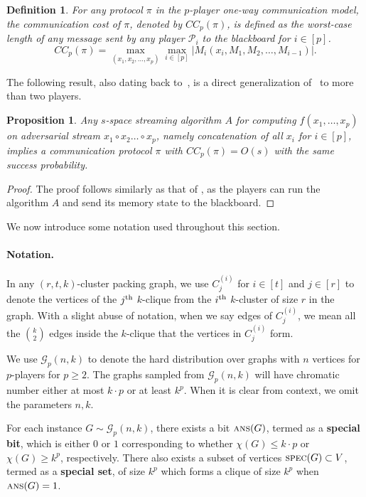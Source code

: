 \documentclass[11pt]{article}
\newtheorem{proposition}[lemma]{Proposition}
\newtheorem{definition}[lemma]{Definition}
\theoremstyle{definition}
\renewcommand{\leq}{\leqslant}
\renewcommand{\geq}{\geqslant}
\newcommand{\card}[1]{\left\vert{#1}\right\vert}
\newcommand{\chrom}{\ensuremath{\chi}}
\newcommand{\player}[1]{\ensuremath{\mathcal{P}_{#1}}}
\newcommand{\cG}{\ensuremath{\mathcal{G}}}
\newcommand{\cliqnum}[2]{\ensuremath{C^{(#1)}_{#2}}}
\newcommand{\ans}{\ensuremath{\textnormal{\textsc{ans}}}}
\newcommand{\spec}{\ensuremath{\textnormal{\textsc{spec}}}}
\begin{document}
\begin{definition}
	For any protocol $\pi$ in the $p$-player one-way communication model, the communication cost of $\pi$, denoted by $CC_p(\pi)$, is defined as the worst-case length of any message sent by any player $\player{i}$ to the blackboard for $i \in[p]$. 
	\[
	CC_p(\pi) = \max_{(x_1, x_2, \ldots, x_p)} \max_{i\in[p]} \card{M_i(x_i, M_1, M_2, \ldots, M_{i-1})}.
	\]
\end{definition}

The following result, also dating back to~\cite{AlonMS96}, is a direct generalization of~ to more than two players. 

\begin{proposition}\label{prop:adv-communication-to-stream}
	Any $s$-space streaming algorithm $A$ for computing $f(x_1, \ldots, x_p)$ on adversarial stream $x_1 \circ x_2 \ldots \circ x_p$, namely concatenation of all $x_i$ for $i\in[p]$, implies a communication protocol $\pi$ with $CC_p(\pi)= O(s)$ with the same success probability. 
\end{proposition}
\begin{proof}
	The proof follows similarly as that of , as the players can run the algorithm $A$ and send its memory state to the blackboard.
\end{proof}

We now introduce some notation used throughout this section.
\paragraph{Notation.}
In any $(r,t,k)$-cluster packing graph, we use $\cliqnum{i}{j}$ for $i \in [t]$ and $j \in [r]$ to denote the vertices of the $j^\textnormal{th}$ $k$-clique from the $i^\textnormal{th}$ $k$-cluster of size $r$ in the graph. With a slight abuse of notation, when we say edges of $\cliqnum{i}{j}$, we mean all the $\binom{k}{2}$ edges inside the $k$-clique that the vertices in $\cliqnum{i}{j}$ form. 

We use $\cG_p(n, k)$ to denote the hard distribution over graphs with $n$ vertices for $p$-players for $p \geq 2$. The graphs sampled from $\cG_p(n,k)$ will have chromatic number either at most $k \cdot p$ or at least $k^p$. When it is clear from context, we omit the parameters $n, k$. 

For each instance $G \sim \cG_p(n, k)$, there exists a bit $\ans(G) $, termed as a \textbf{special bit}, which is either $0$ or $1$ corresponding to whether  $\chrom(G) \leq k \cdot p$ or $\chrom(G) \geq k^p$, respectively. There also exists a subset of vertices $\spec(G) \subset V$, termed as a \textbf{special set}, of size $k^p$ which forms a clique of size $k^p$ when $\ans(G) = 1$. 
\end{document}

